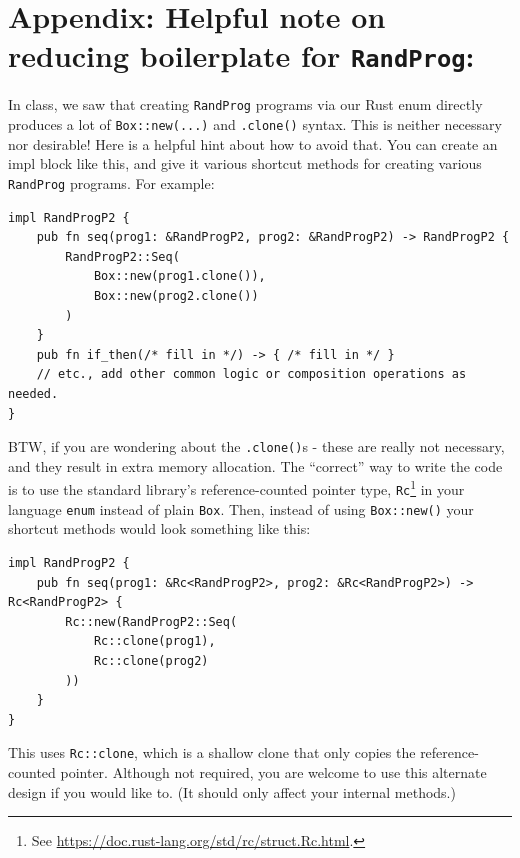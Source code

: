 \documentclass{article}
\theoremstyle{plain}
\begin{document}
\newpage

\section*{\normalsize Appendix: Helpful note on reducing boilerplate for \texttt{RandProg}:}
In class, we saw that creating \texttt{RandProg} programs via our Rust enum directly produces a lot of \texttt{Box::new(...)} and \texttt{.clone()} syntax.
This is neither necessary nor desirable!
Here is a helpful hint about how to avoid that. You can create an impl block like this, and give it various shortcut methods for creating various \texttt{RandProg} programs. For example:
\begin{verbatim}
impl RandProgP2 {
    pub fn seq(prog1: &RandProgP2, prog2: &RandProgP2) -> RandProgP2 {
        RandProgP2::Seq(
            Box::new(prog1.clone()),
            Box::new(prog2.clone())
        )
    }
    pub fn if_then(/* fill in */) -> { /* fill in */ }
    // etc., add other common logic or composition operations as needed.
}
\end{verbatim}

BTW, if you are wondering about the \texttt{.clone()}s - these are really not necessary, and they result in extra memory allocation. The ``correct'' way to write the code is to use the standard library's reference-counted pointer type, \texttt{Rc}\footnote{
    See \url{https://doc.rust-lang.org/std/rc/struct.Rc.html}.
}
in your language \texttt{enum} instead of plain \texttt{Box}.
Then, instead of using \texttt{Box::new()} your shortcut methods would look something like this:
\begin{verbatim}
impl RandProgP2 {
    pub fn seq(prog1: &Rc<RandProgP2>, prog2: &Rc<RandProgP2>) -> Rc<RandProgP2> {
        Rc::new(RandProgP2::Seq(
            Rc::clone(prog1),
            Rc::clone(prog2)
        ))
    }
}
\end{verbatim}

This uses \texttt{Rc::clone}, which is a shallow clone that only copies the reference-counted pointer.
Although not required, you are welcome to use this alternate design if you would like to.
(It should only affect your internal methods.)
\end{document}

